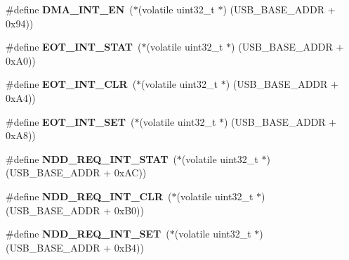 \begin{DoxyCompactItemize}
\item 
\mbox{\label{group__lpc24xx__regs_gaf95b52bf77789e823ab2ff8791272ed0}} 
\#define {\bfseries D\+M\+A\+\_\+\+I\+N\+T\+\_\+\+EN}~($\ast$(volatile uint32\+\_\+t $\ast$) (U\+S\+B\+\_\+\+B\+A\+S\+E\+\_\+\+A\+D\+DR + 0x94))
\item 
\mbox{\label{group__lpc24xx__regs_ga08e3e93c616fe5cf100681df8734c68a}} 
\#define {\bfseries E\+O\+T\+\_\+\+I\+N\+T\+\_\+\+S\+T\+AT}~($\ast$(volatile uint32\+\_\+t $\ast$) (U\+S\+B\+\_\+\+B\+A\+S\+E\+\_\+\+A\+D\+DR + 0x\+A0))
\item 
\mbox{\label{group__lpc24xx__regs_ga8d15366d00bf92d475edc4d801a48623}} 
\#define {\bfseries E\+O\+T\+\_\+\+I\+N\+T\+\_\+\+C\+LR}~($\ast$(volatile uint32\+\_\+t $\ast$) (U\+S\+B\+\_\+\+B\+A\+S\+E\+\_\+\+A\+D\+DR + 0x\+A4))
\item 
\mbox{\label{group__lpc24xx__regs_ga42491e34a60716bca0a0dd80b0a391cc}} 
\#define {\bfseries E\+O\+T\+\_\+\+I\+N\+T\+\_\+\+S\+ET}~($\ast$(volatile uint32\+\_\+t $\ast$) (U\+S\+B\+\_\+\+B\+A\+S\+E\+\_\+\+A\+D\+DR + 0x\+A8))
\item 
\mbox{\label{group__lpc24xx__regs_ga8e09ea95499bfbb4e25f557f46acc366}} 
\#define {\bfseries N\+D\+D\+\_\+\+R\+E\+Q\+\_\+\+I\+N\+T\+\_\+\+S\+T\+AT}~($\ast$(volatile uint32\+\_\+t $\ast$) (U\+S\+B\+\_\+\+B\+A\+S\+E\+\_\+\+A\+D\+DR + 0x\+A\+C))
\item 
\mbox{\label{group__lpc24xx__regs_ga35477d374d9432873059fef85a0e035d}} 
\#define {\bfseries N\+D\+D\+\_\+\+R\+E\+Q\+\_\+\+I\+N\+T\+\_\+\+C\+LR}~($\ast$(volatile uint32\+\_\+t $\ast$) (U\+S\+B\+\_\+\+B\+A\+S\+E\+\_\+\+A\+D\+DR + 0x\+B0))
\item 
\mbox{\label{group__lpc24xx__regs_ga77232f1bf7672444326bee92c14ce640}} 
\#define {\bfseries N\+D\+D\+\_\+\+R\+E\+Q\+\_\+\+I\+N\+T\+\_\+\+S\+ET}~($\ast$(volatile uint32\+\_\+t $\ast$) (U\+S\+B\+\_\+\+B\+A\+S\+E\+\_\+\+A\+D\+DR + 0x\+B4))
\item 
\mbox{\label{group__lpc24xx__regs_ga26c05baea79134a23e2827ed7c2bebf8}} 

\end{DoxyCompactItemize}
